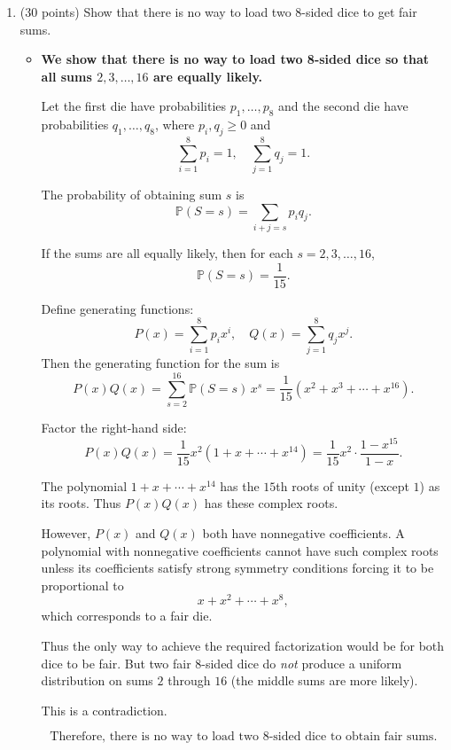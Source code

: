 \documentclass[12pt]{article}
\begin{document}
\begin{enumerate}
\begin{enumerate}
\end{enumerate}

\vfill 

\centerline{\bf GO TO THE NEXT PAGE}

\newpage

\item 
(30 points)
Show that there is no way to load two 8-sided dice to get fair sums. 
\begin{itemize}
    \item \textbf{We show that there is no way to load two 8-sided dice so that all sums $2,3,\dots,16$ are equally likely.}

Let the first die have probabilities $p_1,\dots,p_8$ and the second die have probabilities $q_1,\dots,q_8$, where $p_i,q_j \ge 0$ and
\[
\sum_{i=1}^8 p_i = 1, \quad \sum_{j=1}^8 q_j = 1.
\]

The probability of obtaining sum $s$ is
\[
\mathbb{P}(S=s)=\sum_{i+j=s} p_i q_j.
\]

If the sums are all equally likely, then for each $s=2,3,\dots,16$,
\[
\mathbb{P}(S=s)=\frac{1}{15}.
\]

Define generating functions:
\[
P(x)=\sum_{i=1}^8 p_i x^i, \quad Q(x)=\sum_{j=1}^8 q_j x^j.
\]
Then the generating function for the sum is
\[
P(x)Q(x)=\sum_{s=2}^{16} \mathbb{P}(S=s)\, x^s = \frac{1}{15}(x^2 + x^3 + \cdots + x^{16}).
\]

Factor the right-hand side:
\[
P(x)Q(x)=\frac{1}{15} x^2(1+x+\cdots+x^{14}) = \frac{1}{15} x^2 \cdot \frac{1-x^{15}}{1-x}.
\]

The polynomial $1+x+\cdots+x^{14}$ has the $15$th roots of unity (except $1$) as its roots. Thus $P(x)Q(x)$ has these complex roots.

However, $P(x)$ and $Q(x)$ both have nonnegative coefficients. A polynomial with nonnegative coefficients cannot have such complex roots unless its coefficients satisfy strong symmetry conditions forcing it to be proportional to
\[
x+x^2+\cdots+x^8,
\]
which corresponds to a fair die.

Thus the only way to achieve the required factorization would be for both dice to be fair. But two fair 8-sided dice do \emph{not} produce a uniform distribution on sums $2$ through $16$ (the middle sums are more likely).

This is a contradiction.

\[
\boxed{\text{Therefore, there is no way to load two 8-sided dice to obtain fair sums.}}
\]
\end{itemize}



\end{enumerate}
\end{document}
